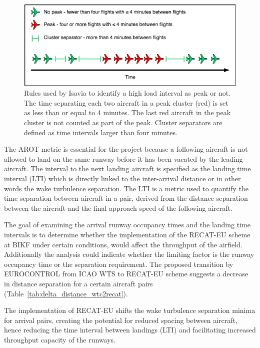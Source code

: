 \begin{figure}[h]
    \centering
    \includegraphics[width=1\textwidth]{graphics/Peak_Diagram.png}
    \caption[Rules defining a peak hour]{Rules used by Isavia to identify a high load interval as peak or not. The time separating each two aircraft in a peak cluster (red) is set as less than or equal to 4 minutes. The last red aircraft in the peak cluster is not counted as part of the peak. Cluster separators are defined as time intervals larger than four minutes.}
    \label{fig:Peak_Diagram}
\end{figure}

The AROT metric is essential for the project because a following aircraft is not allowed to land on the same runway before it has been vacated by the leading aircraft. The interval to the next landing aircraft is specified as the landing time interval (LTI) which is directly linked to the inter-arrival distance or in other words the wake turbulence separation. The LTI is a metric used to quantify the time separation between aircraft in a pair, derived from the distance separation between the aircraft and the final approach speed of the following aircraft.%

The goal of examining the arrival runway occupancy times and the landing time intervals is to determine whether the implementation of the RECAT-EU scheme at BIKF under certain conditions, would affect the throughput of the airfield. Additionally the analysis could indicate whether the limiting factor is the runway occupancy time or the separation requirement. The proposed transition by EUROCONTROL from ICAO WTS to RECAT-EU scheme suggests a decrease in distance separation for a certain aircraft pairs (Table~\ref{tab:delta_distance_wtc2recat}).

The implementation of RECAT-EU shifts the wake turbulence separation minima for arrival pairs, creating the potential for reduced spacing between aircraft, hence reducing the time interval between landings (LTI) and facilitating increased throughput capacity of the runways. 

